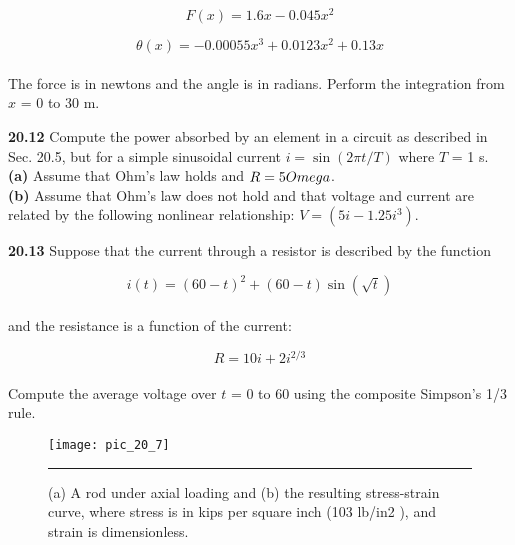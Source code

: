 \documentclass[../main.tex]{subfiles}
\begin{document}
\begin{multicols}{2}
	$$F(x) = 1.6x - 0.045x^{2}$$
	
	$$\theta(x) = -0.00055x^{3} + 0.0123x^{2} + 0.13x $$\\
The force is in newtons and the angle is in radians. Perform
the integration from $x$ = 0 to 30 m.

\textbf{20.12} Compute the power absorbed by an element in a circuit as described in Sec. 20.5, but for a simple sinusoidal
current $i = \sin (2\pi t/T)$ where $T$ = 1 s. \\
\textbf{(a)} Assume that Ohm's law holds and $R = 5 \\Omega$.\\
\textbf{(b)} Assume that Ohm's law does not hold and that voltage
and current are related by the following nonlinear relationship: $V = (5i - 1.25i^{3})$.

\textbf{20.13} Suppose that the current through a resistor is described by the function

	$$i(t) = (60 - t)^{2} + (60 - t) \sin (\sqrt{t})$$\\
and the resistance is a function of the current:

	$$R = 10i + 2i^{2/3}$$\\
Compute the average voltage over $t$ = 0 to 60 using the
composite Simpson's 1/3 rule.

\end{multicols}

\pagebreak


\begin{figure}[hbt!]
	\centering
	\texttt{[image: pic\_20\_7]}
	\caption{\textsf{(a) A rod under axial loading and (b) the resulting stress-strain curve, where
stress is in kips per square inch (103 lb/in2
), and strain is dimensionless.}} \hrule
	\label{pic.20.7}
\end{figure}
\end{document}
